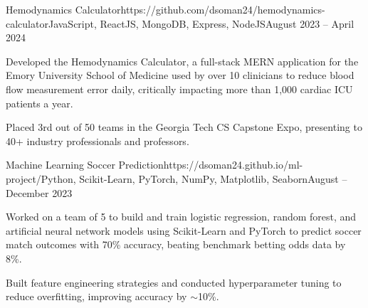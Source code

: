 \documentclass{article}
\begin{document}
\begin{flushleft}

    \vspace{3pt}

    \begin{project}{Hemodynamics Calculator}{https://github.com/dsoman24/hemodynamics-calculator}{JavaScript, ReactJS, MongoDB, Express, NodeJS}{August 2023 -- April 2024}
        \item Developed the Hemodynamics Calculator, a full-stack MERN application for the Emory University School of Medicine used by over 10 clinicians to reduce blood flow measurement error daily, critically impacting more than 1,000 cardiac ICU patients a year.
        \item Placed 3rd out of 50 teams in the Georgia Tech CS Capstone Expo, presenting to 40+ industry professionals and professors.
    \end{project}

    \begin{project}{Machine Learning Soccer Prediction}{https://dsoman24.github.io/ml-project/}{Python, Scikit-Learn, PyTorch, NumPy, Matplotlib, Seaborn}{August -- December 2023}
        \item Worked on a team of 5 to build and train logistic regression, random forest, and artificial neural network models using Scikit-Learn and PyTorch to predict soccer match outcomes with 70\% accuracy, beating benchmark betting odds data by 8\%.
        \item Built feature engineering strategies and conducted hyperparameter tuning to reduce overfitting, improving accuracy by $\sim$10\%.
    \end{project}


    \vspace{3pt}
     \\
     \\
     \\

\end{flushleft}
\end{document}
